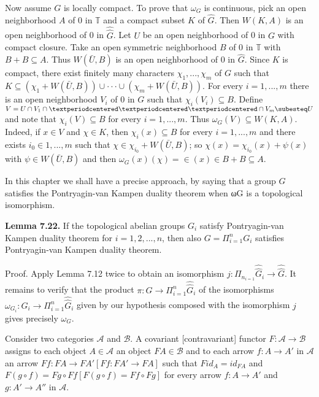 \documentclass[12pt]{article}
\begin{document}
    Now assume $G$ is locally compact. To prove that $\omega_G$ is continuous, pick an open neighborhood $A$ of 0 in $\mathbb{T}$ and
a compact subset $K$ of $\hat{G}$. Then $W(K, A)$ is an open neighborhood of 0 in $\hat{\hat{G}}$. Let $U$ be an open neighborhood of
0 in $G$ with compact closure. Take an open symmetric neighborhood $B$ of 0 in $\mathbb{T}$ with $B+B \subseteq A$. Thus $W(\bar{U}, B)$
is an open neighborhood of 0 in $\hat{G}$. Since $K$ is compact, there exist finitely many characters $\chi_1, . . . , \chi_m$ of $G$
such that $K \subseteq (\chi_1 + W(\bar{U}, B)) \cup · · · \cup (\chi_m + W(\bar{U}, B))$. For every $i = 1, . . . , m$ there is an open neighborhood
$V_i$ of 0 in $G$ such that $\chi_i(V_i) \subseteq B$. Define $V = U \cap V_1 \cap · · · \cap V_m \subesteq U$ and note that $\chi_i(V ) \subseteq B$ for every
$i = 1, . . . , m$. Thus $\omega_G(V ) \subseteq W(K, A)$. Indeed, if $x \in V$ and $\chi \in K$, then $\chi_i(x) \subseteq B$ for every $i = 1, . . . , m$ and
there exists $i_0 \in {1, . . . , m}$ such that $\chi \in \chi_{i_0} + W(\bar{U}, B)$; so $\chi(x) = \chi_{i_0} (x) + \psi (x)$ with $\psi \in W(\bar{U}, B)$ and then
$\omega_G(x)(\chi) = \in(x) \in B + B \subseteq A$.


    In this chapter we shall have a precise approach, by saying that a group $G$ satisfies the Pontryagin-van
Kampen duality theorem when ωG is a topological isomorphism.


\textbf{Lemma 7.22.} If the topological abelian groups $G_i$ satisfy Pontryagin-van Kampen duality theorem for
$i = 1, 2, . . . , n$, then also $G =\Pi^{n}_{i=1} G_i$ satisfies Pontryagin-van Kampen duality theorem.


    Proof. Apply Lemma 7.12 twice to obtain an isomorphism $j : \Pi_n_{i=1} \hat{\hat{G}}_i \to \hat{\hat{G}}$. It remains to verify that the
product $\pi : G \to \Pi^n_{i=1} \hat{\hat{G}}_i$ of the isomorphisms $\omega_{G_i}: G_i \to \Pi^n_{i=1} \hat{\hat{G}}_i$ given by our hypothesis composed with the
isomorphism $j$ gives precisely $\omega_G$.


    Consider two categories $\mathcal{A}$ and $\mathcal{B}$. A covariant [contravariant] functor $F : \mathcal{A} \to \mathcal{B}$ assigns to each object
$A \in \mathcal{A}$ an object $F A \in \mathcal{B}$ and to each arrow $f : A \to A'$ in $\mathcal{A}$ an arrow $F f : F A \to F A'[F f : F A' \to F A]$ such
that $F id_A = id_{FA}$ and $F(g \circ f) = F g \circ F f [F(g \circ f) = F f \circ F g]$ for every arrow $f : A \to A'$ and $g : A' → A''$
in $\mathcal{A}$.
\end{document}
